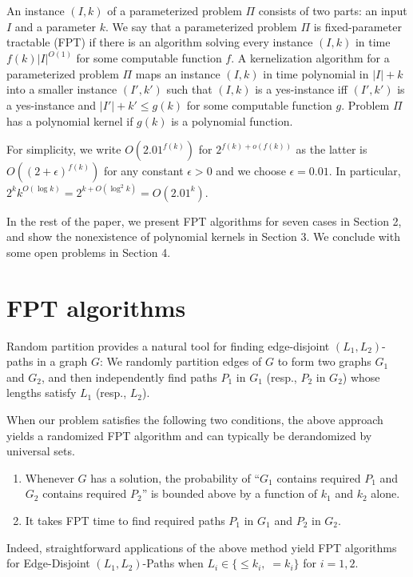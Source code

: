\documentclass{llncs}
\begin{document}
An instance $(I, k)$ of a parameterized problem $\Pi$ 
consists of two parts: an input $I$ and a parameter $k$. 
We say that a parameterized problem $\Pi$ is fixed-parameter tractable (FPT) if 
there is an algorithm solving every instance $(I, k)$ in time $f(k)|I|^{O(1)}$ 
for some computable function $f$. 
A kernelization algorithm for a parameterized problem $\Pi$ maps an instance $(I , k)$ 
in time polynomial in $|I| + k$ into a smaller instance $(I', k')$ 
such that $(I , k)$ is a yes-instance iff $(I', k')$ is a yes-instance 
and $|I'| + k' \le g(k)$ for some computable function $g$. 
Problem $\Pi$ has a polynomial kernel if $g(k)$ is a polynomial function. 

For simplicity, we write $O(2.01^{f(k)})$ for $2^{f(k) + o(f(k))}$ 
as the latter is $O((2 + \epsilon)^{f(k)})$ for any constant $\epsilon > 0$ 
and we choose $\epsilon = 0.01$. 
In particular, $2^k k^{O(\log k)} = 2^{k + O(\log^2 k)} = O(2.01^k)$. 

In the rest of the paper, we present FPT algorithms for seven cases in Section 2, 
and show the nonexistence of polynomial kernels in Section 3. 
We conclude with some open problems in Section 4. 

\section{FPT algorithms}

Random partition provides a natural tool for finding edge-disjoint $(L_1,L_2)$-paths
in a graph $G$: We randomly partition edges of $G$ to form two graphs $G_1$ and $G_2$,
and then independently find paths $P_1$ in $G_1$ (resp., $P_2$ in $G_2$)
whose lengths satisfy $L_1$ (resp., $L_2$).

When our problem satisfies the following two conditions, the above approach
yields a randomized FPT algorithm and can typically be derandomized by universal sets.

\begin{enumerate}
	\item Whenever $G$ has a solution, the probability of ``$G_1$ contains required $P_1$ and
	$G_2$ contains required $P_2$'' is bounded above by a function of $k_1$ and $k_2$ alone.
	
	\item It takes FPT time to find required paths $P_1$ in $G_1$ and $P_2$ in $G_2$.
\end{enumerate}

Indeed, straightforward applications of the above method yield FPT algorithms for
{\sc Edge-Disjoint $(L_1,L_2)$-Paths} when $L_i \in \{ \le k_i, \; = k_i\}$
for $i = 1,2$.
\end{document}
